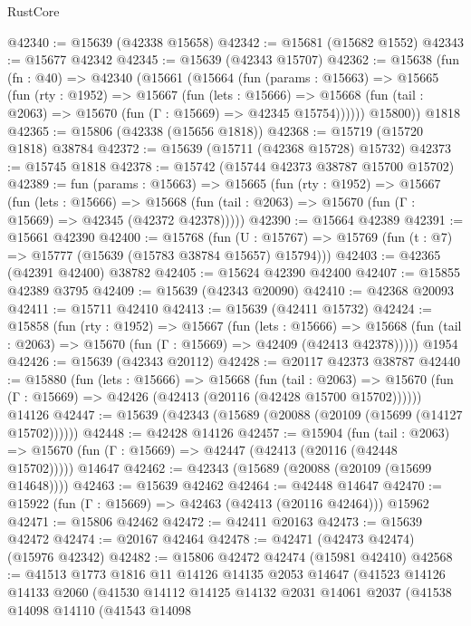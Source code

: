 \begin{lexlean}{RustCore}
\begin{coremodule}
@42340 := @15639 (@42338 @15658)
@42342 := @15681 (@15682 @1552)
@42343 := @15677 @42342
@42345 := @15639 (@42343 @15707)
@42362 := @15638
    (fun (fn : @40) =>
    @42340
      (@15661
        (@15664
          (fun (params : @15663) =>
          @15665
            (fun (rty : @1952) =>
            @15667
              (fun (lets : @15666) =>
              @15668 (fun (tail : @2063) => @15670 (fun (Γ : @15669) => @42345 @15754))))))
        @15800))
    @1818
@42365 := @15806 (@42338 (@15656 @1818))
@42368 := @15719 (@15720 @1818) @38784
@42372 := @15639 (@15711 (@42368 @15728) @15732)
@42373 := @15745 @1818
@42378 := @15742 (@15744 @42373 @38787 @15700 @15702)
@42389 := fun (params : @15663) =>
  @15665
    (fun (rty : @1952) =>
    @15667
      (fun (lets : @15666) =>
      @15668 (fun (tail : @2063) => @15670 (fun (Γ : @15669) => @42345 (@42372 @42378)))))
@42390 := @15664 @42389
@42391 := @15661 @42390
@42400 := @15768
    (fun (U : @15767) => @15769 (fun (t : @7) => @15777 (@15639 (@15783 @38784 @15657) @15794)))
@42403 := @42365 (@42391 @42400) @38782
@42405 := @15624 @42390 @42400
@42407 := @15855 @42389 @3795
@42409 := @15639 (@42343 @20090)
@42410 := @42368 @20093
@42411 := @15711 @42410
@42413 := @15639 (@42411 @15732)
@42424 := @15858
    (fun (rty : @1952) =>
    @15667
      (fun (lets : @15666) =>
      @15668 (fun (tail : @2063) => @15670 (fun (Γ : @15669) => @42409 (@42413 @42378)))))
    @1954
@42426 := @15639 (@42343 @20112)
@42428 := @20117 @42373 @38787
@42440 := @15880
    (fun (lets : @15666) =>
    @15668
      (fun (tail : @2063) =>
      @15670 (fun (Γ : @15669) => @42426 (@42413 (@20116 (@42428 @15700 @15702))))))
    @14126
@42447 := @15639 (@42343 (@15689 (@20088 (@20109 (@15699 (@14127 @15702))))))
@42448 := @42428 @14126
@42457 := @15904
    (fun (tail : @2063) => @15670 (fun (Γ : @15669) => @42447 (@42413 (@20116 (@42448 @15702)))))
    @14647
@42462 := @42343 (@15689 (@20088 (@20109 (@15699 @14648))))
@42463 := @15639 @42462
@42464 := @42448 @14647
@42470 := @15922 (fun (Γ : @15669) => @42463 (@42413 (@20116 @42464))) @15962
@42471 := @15806 @42462
@42472 := @42411 @20163
@42473 := @15639 @42472
@42474 := @20167 @42464
@42478 := @42471 (@42473 @42474) (@15976 @42342)
@42482 := @15806 @42472 @42474 (@15981 @42410)
@42568 := @41513
    @1773
    @1816
    @11
    @14126
    @14135
    @2053
    @14647
    (@41523
      @14126
      @14133
      @2060
      (@41530
        @14112
        @14125
        @14132
        @2031
        @14061
        @2037
        (@41538
          @14098
          @14110
          (@41543
            @14098

\end{coremodule}
\end{lexlean}

